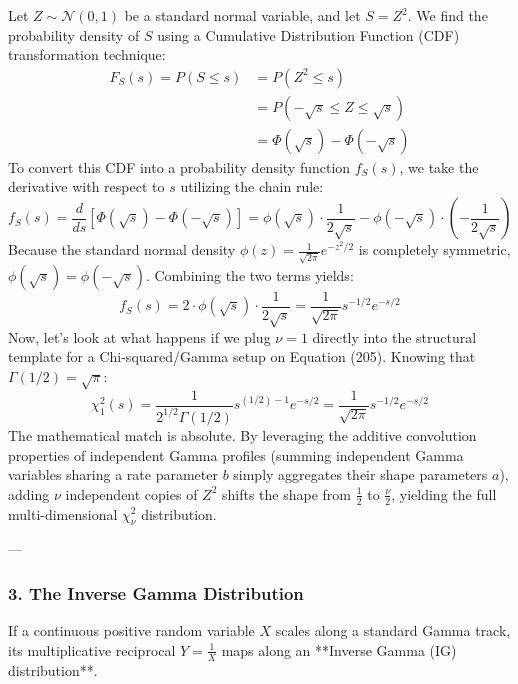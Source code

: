 \documentclass{article}
\begin{document}
Let $Z \sim \mathcal{N}(0, 1)$ be a standard normal variable, and let $S = Z^2$. We find the probability density of $S$ using a Cumulative Distribution Function (CDF) transformation technique:
\begin{align*}
F_S(s) = P(S \le s) &= P(Z^2 \le s) \\
&= P(-\sqrt{s} \le Z \le \sqrt{s}) \\
&= \Phi(\sqrt{s}) - \Phi(-\sqrt{s})
\end{align*}
To convert this CDF into a probability density function $f_S(s)$, we take the derivative with respect to $s$ utilizing the chain rule:
\begin{equation*}
f_S(s) = \frac{d}{ds} \left[ \Phi(\sqrt{s}) - \Phi(-\sqrt{s}) \right] = \phi(\sqrt{s}) \cdot \frac{1}{2\sqrt{s}} - \phi(-\sqrt{s}) \cdot \left(-\frac{1}{2\sqrt{s}}\right)
\end{equation*}
Because the standard normal density $\phi(z) = \frac{1}{\sqrt{2\pi}}e^{-z^2/2}$ is completely symmetric, $\phi(\sqrt{s}) = \phi(-\sqrt{s})$. Combining the two terms yields:
\begin{equation*}
f_S(s) = 2 \cdot \phi(\sqrt{s}) \cdot \frac{1}{2\sqrt{s}} = \frac{1}{\sqrt{2\pi}} s^{-1/2} e^{-s/2}
\end{equation*}
Now, let's look at what happens if we plug $\nu = 1$ directly into the structural template for a Chi-squared/Gamma setup on Equation (205). Knowing that $\Gamma(1/2) = \sqrt{\pi}$:
\begin{equation*}
\chi^2_1(s) = \frac{1}{2^{1/2}\Gamma(1/2)} s^{(1/2)-1} e^{-s/2} = \frac{1}{\sqrt{2\pi}} s^{-1/2} e^{-s/2}
\end{equation*}
The mathematical match is absolute. By leveraging the additive convolution properties of independent Gamma profiles (summing independent Gamma variables sharing a rate parameter $b$ simply aggregates their shape parameters $a$), adding $\nu$ independent copies of $Z^2$ shifts the shape from $\frac{1}{2}$ to $\frac{\nu}{2}$, yielding the full multi-dimensional $\chi^2_\nu$ distribution.

---

\subsubsection*{3. The Inverse Gamma Distribution}

If a continuous positive random variable $X$ scales along a standard Gamma track, its multiplicative reciprocal $Y = \frac{1}{X}$ maps along an **Inverse Gamma (IG) distribution**.
\end{document}
